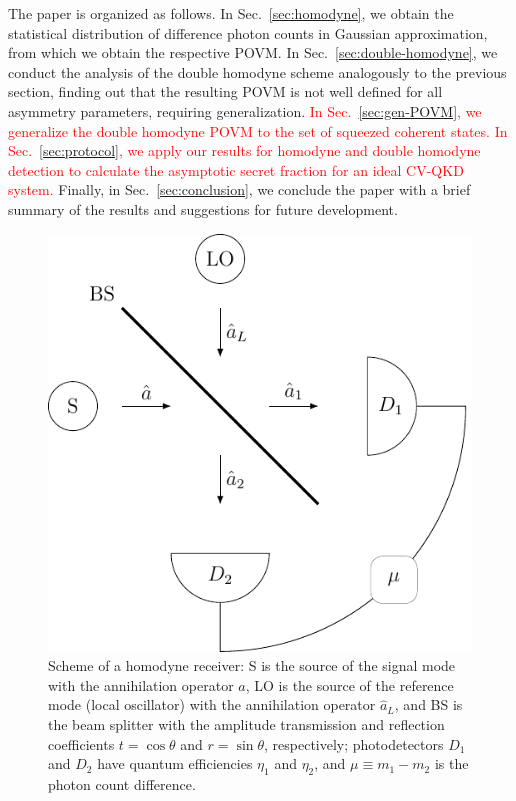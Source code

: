 \documentclass[%
reprint,
superscriptaddress,
 amsmath,amssymb,amsfonts,
 aps,
 pra,
 longbibliography
]{revtex4-2}
\begin{document}
The paper is organized as follows. In Sec.~\ref{sec:homodyne}, we obtain the statistical distribution of difference photon counts in Gaussian approximation, from which we obtain the respective POVM. %
In Sec.~\ref{sec:double-homodyne}, we conduct the analysis of the double homodyne scheme analogously to the previous section, finding out that the resulting POVM is not well defined for all asymmetry parameters, requiring generalization. \textcolor{red}{ In Sec.~\ref{sec:gen-POVM}, we generalize the double homodyne POVM to the set of squeezed coherent states. In Sec.~\ref{sec:protocol}, we apply our results for homodyne and double homodyne detection to calculate the asymptotic secret fraction for an ideal CV-QKD system.}
Finally, in Sec.~\ref{sec:conclusion}, we conclude the paper with a brief summary of the results and suggestions for future development.

\begin{figure}
    \centering
    \includegraphics[width=0.9\linewidth]{pics/schemes/homodyne.pdf}
    \caption{Scheme of a homodyne receiver: S is the source of the
      signal mode with the annihilation operator $\hat{a}$,
      LO is the source of the reference mode (local oscillator) with the annihilation
      operator $\hat{a}_{L}$, and BS is the beam splitter with
      the amplitude transmission and reflection coefficients
      $t=\cos\theta$ and $r=\sin\theta$, respectively; photodetectors $D_1$ and $D_2$ have quantum efficiencies
     $\eta_{1}$ and $\eta_{2}$, and $\mu\equiv m_1-m_2$ is the photon count
      difference.}
    \label{fig:homodyne}
\end{figure}
\end{document}
